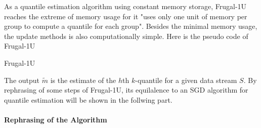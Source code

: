 As a quantile estimation algorithm using constant memory storage, Frugal-1U reaches the extreme of memory usage for it "uses only one unit of memory per group to compute a quantile for each group"\cite{maFrugalStreamingEstimating2014}. Besides the minimal memory usage, the update methods is also computationally simple. Here is the pseudo code of Frugal-1U
\begin{algorithm}
\caption{Frugal-1U}\label{alg:frugal_1U}
    \begin{algorithmic}[1]
                \EndIf
            \EndFor
    \end{algorithmic}
\end{algorithm}
The output $\tilde{m}$ is the estimate of the $h$th $k$-quantile for a given data stream $S$. 
By rephrasing of some steps of Frugal-1U, 
its equilalence to an SGD algorithm for quantile estimation will be shown in the follwing part.
\\\\
\textbf{Rephrasing of the Algorithm} \label{replacements}
